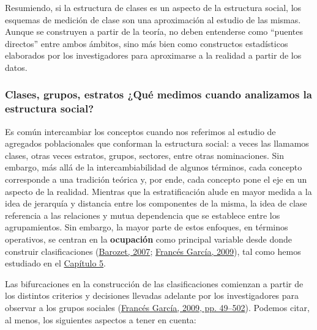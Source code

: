\documentclass[
]{article}
\begin{document}
Resumiendo, si la estructura de clases es un aspecto de la estructura social, los esquemas de medición de clase son una aproximación al estudio de las mismas. Aunque se construyen a partir de la teoría, no deben entenderse como ``puentes directos'' entre ambos ámbitos, sino más bien como constructos estadísticos elaborados por los investigadores para aproximarse a la realidad a partir de los datos.

\hypertarget{clases-grupos-estratos-quuxe9-medimos-cuando-analizamos-la-estructura-social}{%
\subsubsection{Clases, grupos, estratos ¿Qué medimos cuando analizamos la estructura social?}\label{clases-grupos-estratos-quuxe9-medimos-cuando-analizamos-la-estructura-social}}

Es común intercambiar los conceptos cuando nos referimos al estudio de agregados poblacionales que conforman la estructura social: a veces las llamamos clases, otras veces estratos, grupos, sectores, entre otras nominaciones. Sin embargo, más allá de la intercambiabilidad de algunos términos, cada concepto corresponde a una tradición teórica y, por ende, cada concepto pone el eje en un aspecto de la realidad. Mientras que la estratificación alude en mayor medida a la idea de jerarquía y distancia entre los componentes de la misma, la idea de clase referencia a las relaciones y mutua dependencia que se establece entre los agrupamientos. Sin embargo, la mayor parte de estos enfoques, en términos operativos, se centran en la \textbf{ocupación} como principal variable desde donde construir clasificaciones (\protect\hyperlink{ref-Barozet2007}{Barozet, 2007}; \protect\hyperlink{ref-FrancesGarcia2009}{Francés García, 2009}), tal como hemos estudiado en el \protect\hyperlink{ocupacion}{Capítulo 5}.

Las bifurcaciones en la construcción de las clasificaciones comienzan a partir de los distintos criterios y decisiones llevadas adelante por los investigadores para observar a los grupos sociales (\protect\hyperlink{ref-FrancesGarcia2009}{Francés García, 2009, pp. 49--502}). Podemos citar, al menos, los siguientes aspectos a tener en cuenta:
\end{document}
